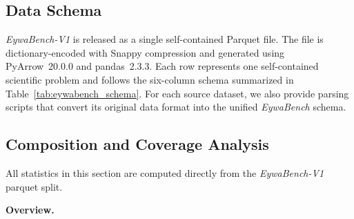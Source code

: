 \subsection{Data Schema}

\begin{table}[h]
    \centering
    \caption{Data schema of \textit{EywaBench}. The benchmark is stored as a dictionary-encoded Parquet file with 200 task instances and six fields.}
    \label{tab:eywabench_schema}
\end{table}


\textit{EywaBench-V1} is released as a single self-contained Parquet file. The file is dictionary-encoded with Snappy compression and generated using PyArrow~20.0.0 and pandas~2.3.3. Each row represents one self-contained scientific problem and follows the six-column schema summarized in Table~\ref{tab:eywabench_schema}. For each source dataset, we also provide parsing scripts that convert its original data format into the unified \textit{EywaBench} schema.


\subsection{Composition and Coverage Analysis}
\label{sec:eywabench_analysis}


All statistics in this section are computed directly from the \textit{EywaBench-V1} parquet split.

\textbf{Overview.}

